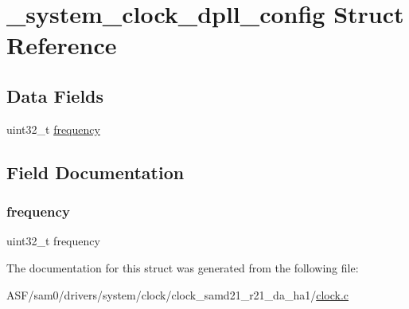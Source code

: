 \hypertarget{struct__system__clock__dpll__config}{}\section{\+\_\+system\+\_\+clock\+\_\+dpll\+\_\+config Struct Reference}
\label{struct__system__clock__dpll__config}
\subsection*{Data Fields}
\begin{DoxyCompactItemize}
\item 
uint32\+\_\+t \mbox{\hyperlink{struct__system__clock__dpll__config_ab632fb0b4d5156ea4df0b1e15410e913}{frequency}}
\end{DoxyCompactItemize}


\subsection{Field Documentation}
\mbox{\label{struct__system__clock__dpll__config_ab632fb0b4d5156ea4df0b1e15410e913}} 
\subsubsection{\texorpdfstring{frequency}{frequency}}
{\footnotesize\ttfamily uint32\+\_\+t frequency}



The documentation for this struct was generated from the following file\+:\begin{DoxyCompactItemize}
\item 
A\+S\+F/sam0/drivers/system/clock/clock\+\_\+samd21\+\_\+r21\+\_\+da\+\_\+ha1/\mbox{\hyperlink{clock_8c}{clock.\+c}}\end{DoxyCompactItemize}
